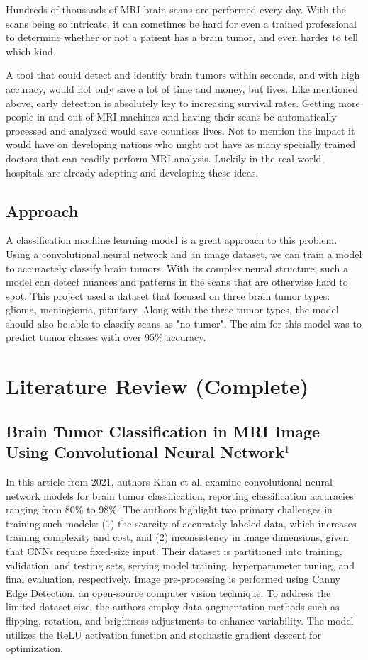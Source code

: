 \documentclass[conference]{IEEEtran}
\begin{document}
Hundreds of thousands of MRI brain scans are performed every day. With the scans being so intricate, it can sometimes be hard for even a trained professional to determine whether or not a patient has a brain tumor, and even harder to tell which kind. 

A tool that could detect and identify brain tumors within seconds, and with high accuracy, would not only save a lot of time and money, but lives. Like mentioned above, early detection is absolutely key to increasing survival rates. Getting more people in and out of MRI machines and having their scans be automatically processed and analyzed would save countless lives. Not to mention the impact it would have on developing nations who might not have as many specially trained doctors that can readily perform MRI analysis. Luckily in the real world, hospitals are already adopting and developing these ideas. 

\subsection{\large Approach}
A classification machine learning model is a great approach to this problem. Using a convolutional neural network and an image dataset, we can train a model to accuractely classify brain tumors. With its complex neural structure, such a model can detect nuances and patterns in the scans that are otherwise hard to spot. This project used a dataset that focused on three brain tumor types: glioma, meningioma, pituitary. Along with the three tumor types, the model should also be able to classify scans as "no tumor". The aim for this model was to predict tumor classes with over 95\% accuracy.

\section{\large Literature Review (Complete)}

\subsection{\large Brain Tumor Classification in MRI Image Using Convolutional Neural Network$^{1}$}

In this article from 2021, authors Khan et al. examine convolutional neural network models for brain tumor classification, reporting classification accuracies ranging from 80\% to 98\%. The authors highlight two primary challenges in training such models: (1) the scarcity of accurately labeled data, which increases training complexity and cost, and (2) inconsistency in image dimensions, given that CNNs require fixed-size input. Their dataset is partitioned into training, validation, and testing sets, serving model training, hyperparameter tuning, and final evaluation, respectively. Image pre-processing is performed using Canny Edge Detection, an open-source computer vision technique. To address the limited dataset size, the authors employ data augmentation methods such as flipping, rotation, and brightness adjustments to enhance variability. The model utilizes the ReLU activation function and stochastic gradient descent for optimization.
\end{document}
